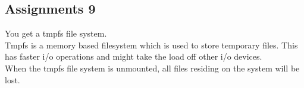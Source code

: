 \subsection{Assignments 9} 
You get a tmpfs file system. \\
Tmpfs is a memory based filesystem which is used to store temporary files. This has faster i/o operations and might take the load off other i/o devices.\\
When the tmpfs file system is unmounted, all files residing on the system will be lost.
